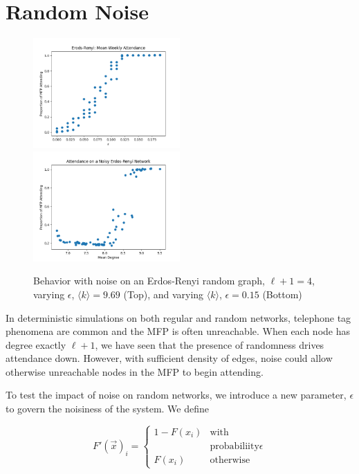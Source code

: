 \documentclass[12pt]{article}
\begin{document}
\section{Random Noise}
\begin{figure}
  \includegraphics[width=0.5\textwidth]{noisy_erdos_renyi_mean.png}
  \includegraphics[width=0.5\textwidth]{mean_degree_v_noise.png}
  \caption{Behavior with noise on an Erdos-Renyi random graph, $\ell + 1 = 4$, varying $\epsilon$, $\langle k \rangle = 9.69$ (Top), and varying $\langle k \rangle$, $\epsilon = 0.15$ (Bottom)}
\end{figure}

In deterministic simulations on both regular and random networks, telephone tag phenomena are common and the MFP is often unreachable.  When each node has degree exactly $\ell + 1$, we have seen that the presence of randomness drives attendance down.  However, with sufficient density of edges, noise could allow otherwise unreachable nodes in the MFP to begin attending.

To test the impact of noise on random networks, we introduce a new parameter, $\epsilon$ to govern the noisiness of the system.  We define

\begin{equation}
  F'(\vec{x})_i = \begin{cases}
    1 - F(x_i) &\text{with} \\
    & \text{probabiliity} \epsilon \\
    F(x_i) &\text{otherwise}
  \end{cases}
\end{equation}
\end{document}
